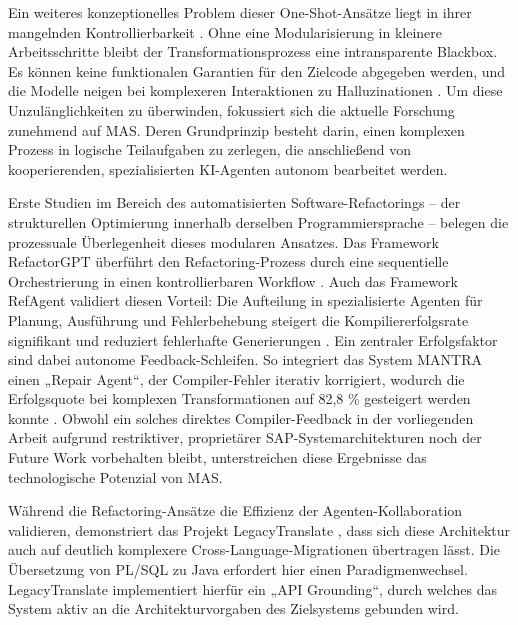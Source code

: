 Ein weiteres konzeptionelles Problem dieser One-Shot-Ansätze liegt in ihrer mangelnden Kontrollierbarkeit \parencite{karabiyikRefactorGPTChatGPTbasedMultiagent2025, oueslatiRefAgentMultiagentLLMbased2026}. Ohne eine Modularisierung in kleinere Arbeitsschritte bleibt der Transformationsprozess eine intransparente Blackbox. Es können keine funktionalen Garantien für den Zielcode abgegeben werden, und die Modelle neigen bei komplexeren Interaktionen zu Halluzinationen \parencite{oueslatiRefAgentMultiagentLLMbased2026,karabiyikRefactorGPTChatGPTbasedMultiagent2025}. Um diese Unzulänglichkeiten zu überwinden, fokussiert sich die aktuelle Forschung zunehmend auf \ac{MAS}. Deren Grundprinzip besteht darin, einen komplexen Prozess in logische Teilaufgaben zu zerlegen, die anschließend von kooperierenden, spezialisierten \ac{KI}-Agenten autonom bearbeitet werden.

Erste Studien im Bereich des automatisierten Software-Refactorings – der strukturellen Optimierung innerhalb derselben Programmiersprache – belegen die prozessuale Überlegenheit dieses modularen Ansatzes. Das Framework RefactorGPT überführt den Refactoring-Prozess durch eine sequentielle Orchestrierung in einen kontrollierbaren Workflow \parencite{karabiyikRefactorGPTChatGPTbasedMultiagent2025}. Auch das Framework RefAgent validiert diesen Vorteil: Die Aufteilung in spezialisierte Agenten für Planung, Ausführung und Fehlerbehebung steigert die Kompiliererfolgsrate signifikant und reduziert fehlerhafte Generierungen \parencite{oueslatiRefAgentMultiagentLLMbased2026}. Ein zentraler Erfolgsfaktor sind dabei autonome Feedback-Schleifen. So integriert das System MANTRA einen „Repair Agent“, der Compiler-Fehler iterativ korrigiert, wodurch die Erfolgsquote bei komplexen Transformationen auf 82,8 \% gesteigert werden konnte \parencite{xuMANTRAEnhancingAutomated2025}. Obwohl ein solches direktes Compiler-Feedback in der vorliegenden Arbeit aufgrund restriktiver, proprietärer SAP-Systemarchitekturen noch der Future Work vorbehalten bleibt, unterstreichen diese Ergebnisse das technologische Potenzial von \ac{MAS}.

Während die Refactoring-Ansätze die Effizienz der Agenten-Kollaboration validieren, demonstriert das Projekt LegacyTranslate \parencite{motiLegacyTranslateLLMbasedMultiAgent2026}, dass sich diese Architektur auch auf deutlich komplexere Cross-Language-Migrationen übertragen lässt. Die Übersetzung von PL/SQL zu Java erfordert hier einen Paradigmenwechsel. LegacyTranslate implementiert hierfür ein „API Grounding“, durch welches das System aktiv an die Architekturvorgaben des Zielsystems gebunden wird. 

